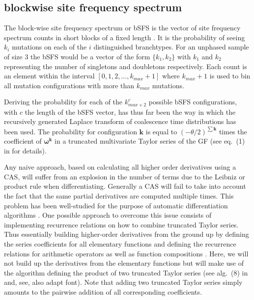 \documentclass[10pt, a4]{article}
\begin{document}
\subsection{blockwise site frequency spectrum} \label{bsfs}

The block-wise site frequency spectrum or bSFS is the vector of site frequency spectrum counts in short blocks of a fixed length \citep{Bunnefeld2015}. It is the probability of seeing $k_i$ mutations on each of the $i$ distinguished branchtypes. For an unphased sample of size 3 the bSFS would be a vector of the form $\{k_1, k_2\}$ with $k_1$ and $k_2$ representing the number of singletons and doubletons respectively. Each count is an element within the interval $[0, 1, 2, ... , k_{max} + 1]$ where $k_{max} + 1$ is used to bin all mutation configurations with more than $k_{max}$ mutations. 

Deriving the probability for each of the $k_{max + 2}^c$ possible bSFS configurations, with $c$ the length of the bSFS vector, has thus far been the way in which the recursively generated Laplace transform of coalescence time distributions has been used. The probability for configuration $\boldsymbol{k}$ is equal to $(-\theta/2)^{\sum \boldsymbol{k}}$ times the coefficient of $\boldsymbol{\omega}^{\boldsymbol{k}}$ in a truncated multivariate Taylor series of the GF (see eq.\ (1) in \citet{Lohse2011} for details).

Any naive approach, based on calculating all higher order derivatives using a CAS, will suffer from an explosion in the number of terms due to the Leibniz or product rule when differentiating. Generally a CAS will fail to take into account the fact that the same partial derivatives are computed multiple times. This problem has been well-studied for the purpose of automatic differentiation algorithms \citep{Neidinger1992, Neidinger1995, Griewank2000, Bettencourt2019}. One possible approach to overcome this issue consists of implementing recurrence relations on how to combine truncated Taylor series. Thus essentially building higher-order derivatives from the ground up by defining the series coefficients for all elementary functions and defining the recurrence relations for arithmetic operators as well as function compositions \citep{Neidinger2013}. Here, we will not build up the derivatives from the elementary functions but will make use of the algorithm defining the product of two truncated Taylor series (see alg.\ (8) in \citet{Neidinger2013} and, see,  also adapt font). Note that adding two truncated Taylor series simply amounts to the pairwise addition of all corresponding coefficients.
\end{document}
